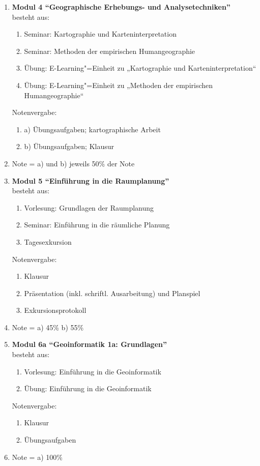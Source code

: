 \begin{enumerate}
 \item \textbf{Modul 4 ``Geographische Erhebungs- und Analysetechniken''}  \\ besteht aus:
  \begin{enumerate}
   \item Seminar: Kartographie und Karteninterpretation
   \item Seminar: Methoden der empirischen Humangeographie
   \item Übung: E-Learning"=Einheit zu „Kartographie und Karteninterpretation“
   \item Übung: E-Learning"=Einheit zu „Methoden der empirischen Humangeographie“
  \end{enumerate}
  Notenvergabe:
   \begin{enumerate}
    \item[] a) Übungsaufgaben; kartographische Arbeit
    \item[] b) Übungsaufgaben; Klausur
  \end{enumerate}
  \item[] Note = a) und b) jeweils 50\% der Note

 \item \textbf{Modul 5 ``Einführung in die Raumplanung''}  \\ besteht aus:
  \begin{enumerate}
   \item Vorlesung: Grundlagen der Raumplanung
   \item Seminar: Einführung in die räumliche Planung
   \item Tagesexkursion
  \end{enumerate}
  Notenvergabe:
  \begin{enumerate}
   \item Klausur
   \item Präsentation (inkl. schriftl. Ausarbeitung) und Planspiel
   \item Exkursionsprotokoll
  \end{enumerate}
  \item[] Note = a) 45\% b) 55\%

 \item \textbf{Modul 6a ``Geoinformatik 1a: Grundlagen''}  \\ besteht aus:
  \begin{enumerate}
   \item Vorlesung: Einführung in die Geoinformatik
   \item Übung: Einführung in die Geoinformatik
  \end{enumerate}
  Notenvergabe:
  \begin{enumerate}
   \item Klausur
   \item Übungsaufgaben
  \end{enumerate}
  \item[] Note = a) 100\%


\end{enumerate}
